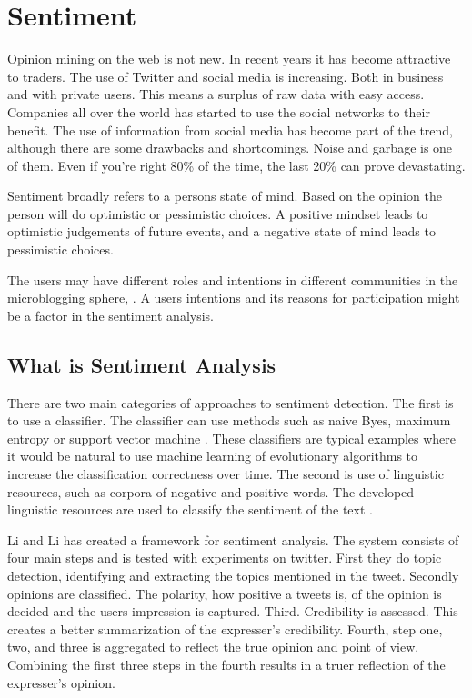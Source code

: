 \section{Sentiment}\label{previous_work:sentiment}

Opinion mining on the web is not new. In recent years it has
become attractive to traders. 
The use of Twitter and social media is increasing. Both in
business and with private users.
This means a surplus of raw data with
easy access. Companies all over the world has started to use the social
networks to their benefit. The use of information from social media has become
part of the trend, although there are some drawbacks and shortcomings. Noise and
garbage is one of them. Even if you're right 80\% of the time, the last 20\% can
prove devastating. \cite[]{stevenson12:social_media_stock_pickers}

Sentiment broadly refers to a persons state of mind. Based on the opinion the
person will do optimistic or pessimistic choices. A positive mindset leads to
optimistic judgements of future events, and a negative state of mind leads to
pessimistic choices.
\cite[p4]{doukas10:sentiment_and_momentum}

The users may have different roles and intentions in different
communities in the microblogging sphere, \cite[]{java07}. 
A users intentions and its reasons for participation might be a factor in the sentiment analysis.

\subsection{What is Sentiment Analysis}
There are two main categories of approaches to sentiment detection. The first is
to use a classifier. The classifier can use methods such as naive Byes, maximum
entropy or support vector machine \cite[]{Li2013206}. These classifiers are
typical examples where it would be natural to use machine learning of
evolutionary algorithms to increase the classification correctness over time.
The second is use of linguistic resources, such as corpora of negative and
positive words. The developed linguistic resources are used to classify the sentiment of the text \cite[]{Li2013206}.

Li and Li has created a framework for sentiment analysis. The system
consists of four main steps  and is tested with experiments on twitter. 
	First they do topic detection, identifying and extracting the topics
mentioned in the tweet. 
	Secondly opinions are classified. The polarity, how positive a tweets is, of the opinion is decided and
the users impression is captured. 	
	Third. Credibility is assessed. This creates a better summarization of the
expresser's credibility. 
	Fourth, step one, two, and three is aggregated to reflect the true opinion
and point of view.
	Combining the first three steps in the fourth results in a truer reflection of
the expresser's opinion. \cite[]{Li2013206} 


